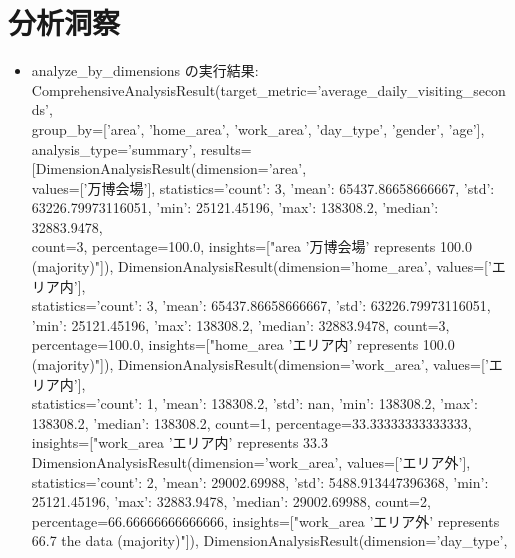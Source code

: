 \documentclass[11pt,a4paper]{article}
\begin{document}
\section{分析洞察}
\begin{itemize}
\item analyze\_by\_dimensions の実行結果:\\
ComprehensiveAnalysisResult(target\_metric='average\_daily\_visiting\_seconds',\\
group\_by=['area', 'home\_area', 'work\_area', 'day\_type', 'gender', 'age'],\\
analysis\_type='summary', results=[DimensionAnalysisResult(dimension='area',\\
values=['万博会場'], statistics={'count': 3, 'mean': 65437.86658666667, 'std':\\
63226.79973116051, 'min': 25121.45196, 'max': 138308.2, 'median': 32883.9478},\\
count=3, percentage=100.0, insights=["area '万博会場' represents 100.0%
(majority)"]), DimensionAnalysisResult(dimension='home\_area', values=['エリア内'],\\
statistics={'count': 3, 'mean': 65437.86658666667, 'std': 63226.79973116051,\\
'min': 25121.45196, 'max': 138308.2, 'median': 32883.9478}, count=3,\\
percentage=100.0, insights=["home\_area 'エリア内' represents 100.0%
(majority)"]), DimensionAnalysisResult(dimension='work\_area', values=['エリア内'],\\
statistics={'count': 1, 'mean': 138308.2, 'std': nan, 'min': 138308.2, 'max':\\
138308.2, 'median': 138308.2}, count=1, percentage=33.33333333333333,\\
insights=["work\_area 'エリア内' represents 33.3%
DimensionAnalysisResult(dimension='work\_area', values=['エリア外'],\\
statistics={'count': 2, 'mean': 29002.69988, 'std': 5488.913447396368, 'min':\\
25121.45196, 'max': 32883.9478, 'median': 29002.69988}, count=2,\\
percentage=66.66666666666666, insights=["work\_area 'エリア外' represents 66.7%
the data (majority)"]), DimensionAnalysisResult(dimension='day\_type',\\

\end{itemize}
\end{document}
